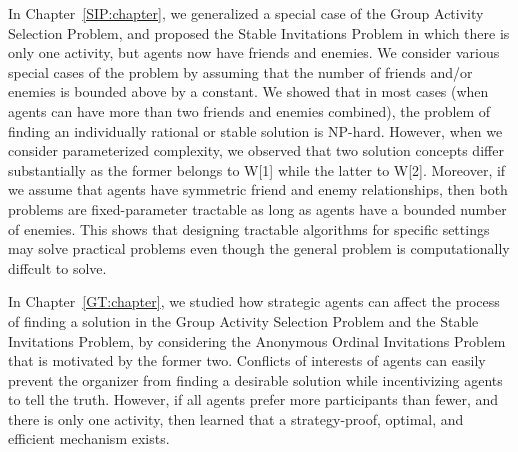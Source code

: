 In Chapter~\ref{SIP:chapter}, we generalized a special case of the Group Activity Selection Problem, and proposed the Stable Invitations Problem in which there is only one activity, but agents now have friends and enemies. We consider various special cases of the problem by assuming that the number of friends and/or enemies is bounded above by a constant. We showed that in most cases (when agents can have more than two friends and enemies combined), the problem of finding an individually rational or stable solution is NP-hard. However, when we consider parameterized complexity, we observed that two solution concepts differ substantially as the former belongs to W[1] while the latter to W[2]. Moreover, if we assume that agents have symmetric friend and enemy relationships, then both problems are fixed-parameter tractable as long as agents have a bounded number of enemies. This shows that designing tractable algorithms for specific settings may solve practical problems even though the general problem is computationally diffcult to solve. 

In Chapter~\ref{GT:chapter}, we studied how strategic agents can affect the process of finding a solution in the Group Activity Selection Problem and the Stable Invitations Problem, by considering the Anonymous Ordinal Invitations Problem that is motivated by the former two. Conflicts of interests of agents can easily prevent the organizer from finding a desirable solution while incentivizing agents to tell the truth. However, if all agents prefer more participants than fewer, and there is only one activity, then learned that a strategy-proof, optimal, and efficient mechanism exists. 


